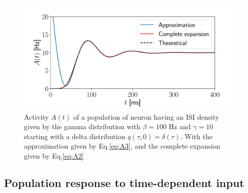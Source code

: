 \documentclass[12pt,twoside]{report}
\begin{document}
\begin{figure}[h!]
	\centering
	\includegraphics[width=0.8\linewidth]{delta_gamma.pdf}
	\caption{Activity $A(t)$ of a population of neuron having an ISI density given by the gamma distribution with $\beta=100$ Hz and $\gamma=10$ starting with a delta distribution $q(\tau,0)=\delta(\tau)$. With the approximation given by Eq.\eqref{eq:A3}, and the complete expansion given by Eq.\ref{eq:A2}}
	\label{fig:delta_gamma}
\end{figure}




\subsection{Population response to time-dependent input}
\end{document}
